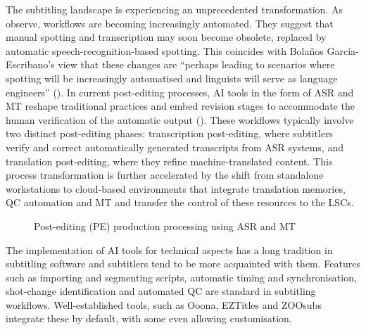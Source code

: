 \documentclass[output=paper]{langscibook}
\begin{document}
The subtitling landscape is experiencing an unprecedented transformation. As \citet{szarkowska2024introducing} observe, workflows are becoming increasingly automated. They suggest that manual spotting and transcription may soon become obsolete, replaced by automatic speech-recognition-based spotting. This coincides with Bolaños García-Escribano’s view that these changes are “perhaps leading to scenarios where spotting will be increasingly automatised and linguists will serve as language engineers” (\citeyear[19]{bolanos2025}). In current post-editing processes, AI tools in the form of ASR and MT reshape traditional practices and embed revision stages to accommodate the human verification of the automatic output (). These workflows typically involve two distinct post-editing phases: transcription post-editing, where subtitlers verify and correct automatically generated transcripts from ASR systems, and translation post-editing, where they refine machine-translated content. This process transformation is further accelerated by the shift from standalone workstations to cloud-based environments that integrate translation memories, QC automation and MT and transfer the control of these resources to the LSCs.

\begin{figure}
\small
{}
\caption{Post-editing (PE) production processing using ASR and MT}
\label{fig:9:3}
\end{figure}

The implementation of AI tools for technical aspects has a long tradition in subtitling software and subtitlers tend to be more acquainted with them. Features such as importing and segmenting scripts, automatic timing and synchronisation, shot\hyp change identification and automated QC are standard in subtitling workflows. Well-established tools, such as Ooona, EZTitles and ZOOsubs integrate these by default, with some even allowing customisation.
\end{document}
